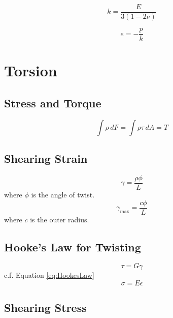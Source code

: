 \documentclass[twoside]{article}
\begin{document}
	\begin{equation}
		k = \frac{E}{3(1-2\nu)}
		\label{eq:BulkModulus}
	\end{equation}
	
	\begin{equation}
		e = -\frac{p}{k}
		\label{eq:DilataionAndBulkModulus}
	\end{equation}
	
	\newpage
	
	\section{Torsion}
	
	\subsection{Stress and Torque}
	
	\begin{equation}
		\int \rho \, dF = \int \rho \tau \, dA = T
		\label{eq:StressAndTorque}
	\end{equation}
	
	\subsection{Shearing Strain}
	
	\begin{equation}
		\gamma = \frac{\rho \phi}{L}
		\label{eq:ShearingStrainTwist}
	\end{equation}
	where $\phi$ is the angle of twist.
	\begin{equation}
		\gamma_\text{max} = \frac{c \phi}{L}
		\label{eq:SheaingStrainTwistMax}
	\end{equation}
	where $c$ is the outer radius.
	
	\subsection{Hooke's Law for Twisting}
	
	\begin{equation}
		\tau = G \gamma
		\label{eq:HookesLawTwist}
	\end{equation}
	c.f. Equation \ref{eq:HookesLaw}
	\begin{equation*}
		\sigma = E \epsilon
	\end{equation*}
	
	
	\subsection{Shearing Stress}
	
\end{document}
